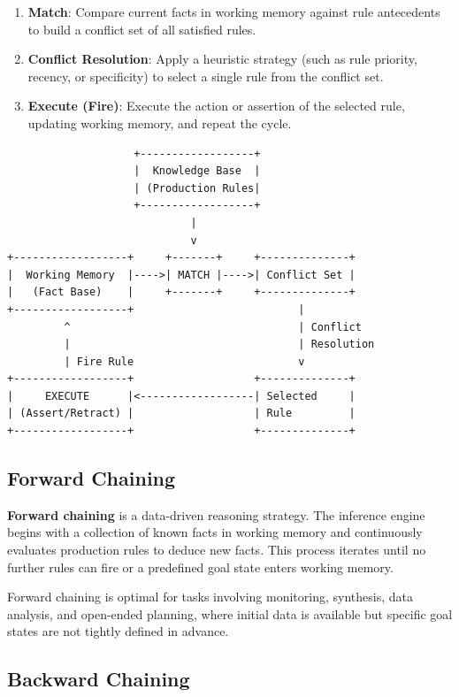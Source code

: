 \documentclass[12pt]{report}
\begin{document}
\begin{enumerate}
    \item \textbf{Match}: Compare current facts in working memory against rule antecedents to build a conflict set of all satisfied rules.
    \item \textbf{Conflict Resolution}: Apply a heuristic strategy (such as rule priority, recency, or specificity) to select a single rule from the conflict set.
    \item \textbf{Execute (Fire)}: Execute the action or assertion of the selected rule, updating working memory, and repeat the cycle.
\end{enumerate}

\begin{verbatim}
                    +------------------+
                    |  Knowledge Base  |
                    | (Production Rules|
                    +------------------+
                             |
                             v
+------------------+     +-------+     +--------------+
|  Working Memory  |---->| MATCH |---->| Conflict Set |
|   (Fact Base)    |     +-------+     +--------------+
+------------------+                          |
         ^                                    | Conflict
         |                                    | Resolution
         | Fire Rule                          v
+------------------+                   +--------------+
|     EXECUTE      |<------------------| Selected     |
| (Assert/Retract) |                   | Rule         |
+------------------+                   +--------------+
\end{verbatim}

\subsection{Forward Chaining}

\textbf{Forward chaining} is a data-driven reasoning strategy. The inference engine begins with a collection of known facts in working memory and continuously evaluates production rules to deduce new facts. This process iterates until no further rules can fire or a predefined goal state enters working memory.

Forward chaining is optimal for tasks involving monitoring, synthesis, data analysis, and open-ended planning, where initial data is available but specific goal states are not tightly defined in advance.

\subsection{Backward Chaining}
\end{document}

